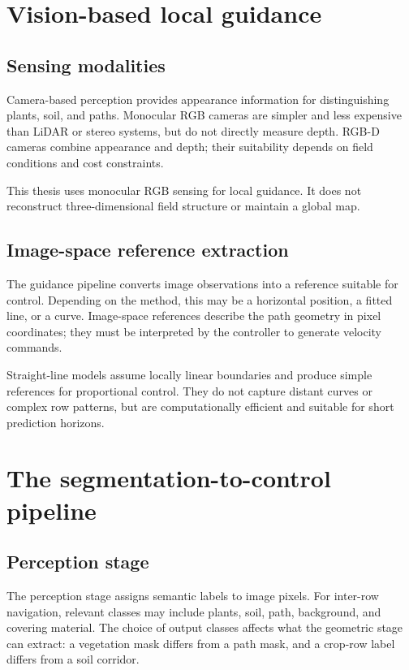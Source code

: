 \section{Vision-based local guidance}
\label{sec:vision_guidance}

\subsection{Sensing modalities}
\label{subsec:sensing_modalities}

Camera-based perception provides appearance information for distinguishing plants, soil, and paths. Monocular RGB cameras are simpler and less expensive than LiDAR or stereo systems, but do not directly measure depth. RGB-D cameras combine appearance and depth; their suitability depends on field conditions and cost constraints.

This thesis uses monocular RGB sensing for local guidance. It does not reconstruct three-dimensional field structure or maintain a global map.

\subsection{Image-space reference extraction}
\label{subsec:image_space_reference}

The guidance pipeline converts image observations into a reference suitable for control. Depending on the method, this may be a horizontal position, a fitted line, or a curve. Image-space references describe the path geometry in pixel coordinates; they must be interpreted by the controller to generate velocity commands.

Straight-line models assume locally linear boundaries and produce simple references for proportional control. They do not capture distant curves or complex row patterns, but are computationally efficient and suitable for short prediction horizons.

\section{The segmentation-to-control pipeline}
\label{sec:pipeline_structure}

\subsection{Perception stage}
\label{subsec:perception_stage}

The perception stage assigns semantic labels to image pixels. For inter-row navigation, relevant classes may include plants, soil, path, background, and covering material. The choice of output classes affects what the geometric stage can extract: a vegetation mask differs from a path mask, and a crop-row label differs from a soil corridor.

